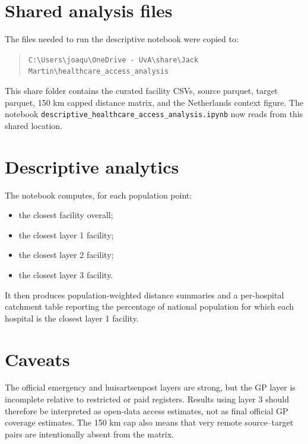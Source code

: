 \documentclass[11pt]{article}
\begin{document}
\section*{Shared analysis files}
The files needed to run the descriptive notebook were copied to:
\begin{quote}
\texttt{C:\textbackslash Users\textbackslash joaqu\textbackslash OneDrive - UvA\textbackslash share\textbackslash Jack Martin\textbackslash healthcare\_access\_analysis}
\end{quote}
This share folder contains the curated facility CSVs, source parquet, target parquet, 150 km capped distance matrix, and the Netherlands context figure. The notebook \texttt{descriptive\_healthcare\_access\_analysis.ipynb} now reads from this shared location.

\section*{Descriptive analytics}
The notebook computes, for each population point:
\begin{itemize}[leftmargin=*]
  \item the closest facility overall;
  \item the closest layer 1 facility;
  \item the closest layer 2 facility;
  \item the closest layer 3 facility.
\end{itemize}
It then produces population-weighted distance summaries and a per-hospital catchment table reporting the percentage of national population for which each hospital is the closest layer 1 facility.

\section*{Caveats}
The official emergency and huisartsenpost layers are strong, but the GP layer is incomplete relative to restricted or paid registers. Results using layer 3 should therefore be interpreted as open-data access estimates, not as final official GP coverage estimates. The 150 km cap also means that very remote source--target pairs are intentionally absent from the matrix.
\end{document}

